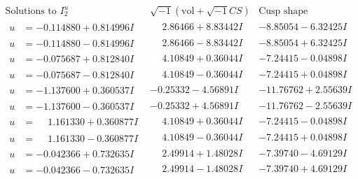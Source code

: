 \documentclass[1p]{elsarticle_modified}
\theoremstyle{definition}
\newcommand{\I}{\sqrt{-1}}
\begin{document}
$$\begin{array}{c|c|c}  
\text{Solutions to }I^u_{2}& \I (\text{vol} + \sqrt{-1}CS) & \text{Cusp shape}\\
 \hline 
\begin{aligned}
u &= -0.114880 + 0.814996 I\end{aligned}
 & \phantom{-}2.86466 + 8.83442 I & -8.85054 - 6.32425 I \\ \hline\begin{aligned}
u &= -0.114880 - 0.814996 I\end{aligned}
 & \phantom{-}2.86466 - 8.83442 I & -8.85054 + 6.32425 I \\ \hline\begin{aligned}
u &= -0.075687 + 0.812840 I\end{aligned}
 & \phantom{-}4.10849 + 0.36044 I & -7.24415 - 0.04898 I \\ \hline\begin{aligned}
u &= -0.075687 - 0.812840 I\end{aligned}
 & \phantom{-}4.10849 - 0.36044 I & -7.24415 + 0.04898 I \\ \hline\begin{aligned}
u &= -1.137600 + 0.360537 I\end{aligned}
 & -0.25332 - 4.56891 I & -11.76762 + 2.55639 I \\ \hline\begin{aligned}
u &= -1.137600 - 0.360537 I\end{aligned}
 & -0.25332 + 4.56891 I & -11.76762 - 2.55639 I \\ \hline\begin{aligned}
u &= \phantom{-}1.161330 + 0.360877 I\end{aligned}
 & \phantom{-}4.10849 + 0.36044 I & -7.24415 - 0.04898 I \\ \hline\begin{aligned}
u &= \phantom{-}1.161330 - 0.360877 I\end{aligned}
 & \phantom{-}4.10849 - 0.36044 I & -7.24415 + 0.04898 I \\ \hline\begin{aligned}
u &= -0.042366 + 0.732635 I\end{aligned}
 & \phantom{-}2.49914 + 1.48028 I & -7.39740 - 4.69129 I \\ \hline\begin{aligned}
u &= -0.042366 - 0.732635 I\end{aligned}
 & \phantom{-}2.49914 - 1.48028 I & -7.39740 + 4.69129 I \\ \hline\begin{aligned}

\end{aligned}
\end{array}$$
\end{document}

